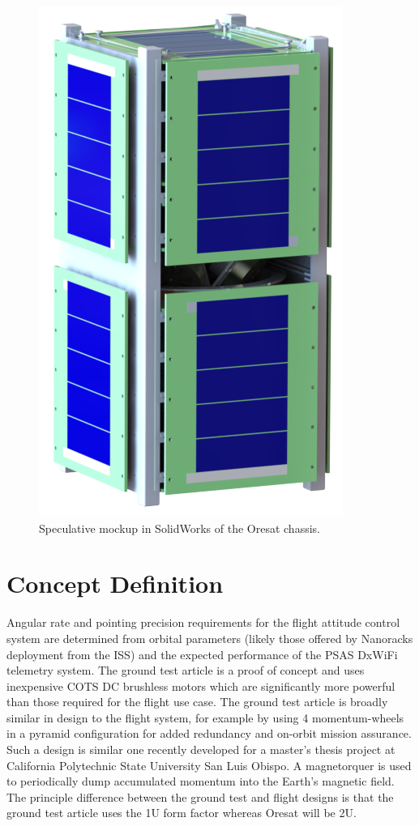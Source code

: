 \documentclass[]{aiaa-tc}%
\begin{document}
\begin{figure}[h!]
  \centering
  \includegraphics[width=0.3\linewidth]{2U_CubeSat_V0o3.PNG}
  \caption{Speculative mockup in SolidWorks of the Oresat chassis.}
  \label{fig:oresat}
\end{figure}

\section{Concept Definition}
	Angular rate and pointing precision requirements for the flight attitude control system are determined from orbital parameters (likely those offered by Nanoracks deployment from the ISS) and the expected performance of the PSAS DxWiFi telemetry system. The ground test article is a proof of concept and uses inexpensive COTS DC brushless motors which are significantly more powerful than those required for the flight use case. The ground test article is broadly similar in design to the flight system, for example by using 4 momentum-wheels in a pyramid configuration for added redundancy and on-orbit mission assurance. Such a design is similar one recently developed for a master's thesis project at California Polytechnic State University San Luis Obispo\cite{Logan:08bk}. A magnetorquer is used to periodically dump accumulated momentum into the Earth's magnetic field. The principle difference between the ground test and flight designs is that the ground test article uses the 1U form factor whereas Oresat will be 2U.
\end{document}
